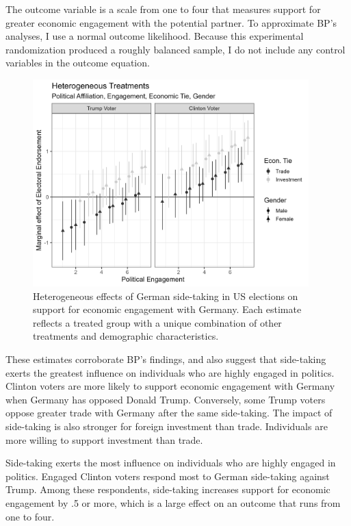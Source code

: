 \documentclass[12pt]{article}
\begin{document}
The outcome variable is a scale from one to four that measures support for greater economic engagement with the potential partner. 
To approximate BP's analyses, I use a normal outcome likelihood. 
Because this experimental randomization produced a roughly balanced sample, I do not include any control variables in the outcome equation. 


\begin{figure}[htpb]
	\centering
		\includegraphics[width=0.95\textwidth]{bp-het-est.png}
	\caption{Heterogeneous effects of German side-taking in US elections on support for economic engagement with Germany. Each estimate reflects a treated group with a unique combination of other treatments and demographic characteristics.}
	\label{fig:bp-het-est}
\end{figure}


These estimates corroborate BP's findings, and also suggest that side-taking exerts the greatest influence on individuals who are highly engaged in politics. 
Clinton voters are more likely to support economic engagement with Germany when Germany has opposed Donald Trump. 
Conversely, some Trump voters oppose greater trade with Germany after the same side-taking. 
The impact of side-taking is also stronger for foreign investment than trade. 
Individuals are more willing to support investment than trade.


Side-taking exerts the most influence on individuals who are highly engaged in politics. 
Engaged Clinton voters respond most to German side-taking against Trump. 
Among these respondents, side-taking increases support for economic engagement by .5 or more, which is a large effect on an outcome that runs from one to four. 


\singlespace
 
 
\end{document}
